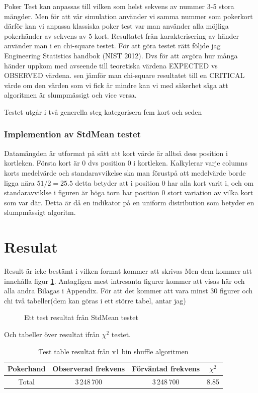 \documentclass[swedish,a4paper]{article}
\begin{document}
Poker Test kan anpassas till vilken som helst sekvens av nummer 3-5 stora
mängder. Men för att vår simulation använder vi samma nummer som pokerkort
därför kan vi anpassa klassiska poker test var man använder alla möjliga
pokerhänder av sekvens av 5 kort. Resultatet från karakterisering av händer
använder man i en chi-square testet. För att göra testet rätt följde jag
Engineering Statistics handbok (NIST 2012). Dvs för att avgöra hur många 
händer
uppkom med avseende till teoretiska värdena EXPECTED vs OBSERVED värdena. sen
jämför man chi-square resultatet till en CRITICAL värde om den värden som vi
fick är mindre kan vi med säkerhet säga att algoritmen är slumpmässigt och 
vice versa.

Testet utgår i två generella steg kategorisera fem kort och seden 

\subsubsection{Implemention av StdMean testet}
Datamängden är utformat på sätt att kort värde är alltså dess position i
kortleken. Första kort är 0 dvs position 0 i kortleken. Kalkylerar varje
columns korts medelvärde och standaravvikelse ska man förustpå att medelvärde
borde ligga nära $51/2= 25.5$ detta betyder att i position 0 har alla kort varit
i, och om standaravviklse i figuren är höga torn har position 0 stort variation
av vilka kort som var där. Detta är då en indikator på en uniform distribution
som betyder en slumpmässigt algoritm.

\section{Resulat}
Result är icke bestämt i vilken format kommer att skrivas
Men dem kommer att innehålla figur \ref{fig:test_figure}. Antagligen mest 
intresanta figurer kommer att visas här och alla andra Bilagas i Appendix.
För att det kommer att vara minst 30 figurer och chi två tabeller(dem 
kan göras i ett större tabel, antar jag)

\begin{figure}[ht]
    \begin{center}
        
    \end{center}
    \caption{Ett test resultat från StdMean testet}
    \label{fig:test_figure}
\end{figure}

Och tabeller över resultat ifrån $\chi^2$ testet.
\begin{table}[h]
	\centering
	\caption{Test table resultat från v1 bin shuffle algoritmen}
	\begin{tabular}{|c|c|c|c|}
		\hline
		Pokerhand & Observerad frekvens & Förväntad frekvens & $\chi^2$ \\ \hline
		Total & 3\,248\,700 & 3\,248\,700 & 8.85 \\ \hline
		
	\end{tabular}
	
\end{table}
\end{document}
